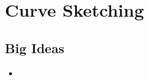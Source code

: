 \chapter{Curve Sketching}
\label{chap:CS}

\section{Big Ideas}
\label{sec:CS Big Ideas}
\begin{itemize}
  \item 
\end{itemize}